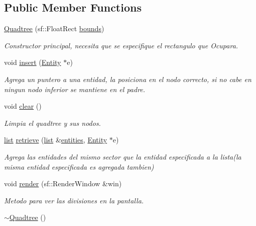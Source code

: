 \subsection*{Public Member Functions}
\begin{DoxyCompactItemize}
\item 
\hyperlink{classant_1_1_utils_1_1_quadtree_a2dc005f81ddcd318dac8d1d53460e3ff}{Quadtree} (sf\+::\+Float\+Rect \hyperlink{classant_1_1_utils_1_1_quadtree_a1b9aecf327adee874486c11a56ce5334}{bounds})
\begin{DoxyCompactList}\small\item\em Constructor principal, necesita que se especifique el rectangulo que Ocupara. \end{DoxyCompactList}\item 
void \hyperlink{classant_1_1_utils_1_1_quadtree_af1f8e490445ee493d7639dc6f621bdfc}{insert} (\hyperlink{classant_1_1_entity}{Entity} $\ast$e)
\begin{DoxyCompactList}\small\item\em Agrega un puntero a una entidad, la posiciona en el nodo correcto, si no cabe en ningun nodo inferior se mantiene en el padre. \end{DoxyCompactList}\item 
void \hyperlink{classant_1_1_utils_1_1_quadtree_aace6744ed7023825a1863f9953421a4b}{clear} ()
\begin{DoxyCompactList}\small\item\em Limpia el quadtree y sus nodos. \end{DoxyCompactList}\item 
\hyperlink{classant_1_1_utils_1_1_quadtree_a744668597e9815bc6cdeb44a48f527dd}{list} \hyperlink{classant_1_1_utils_1_1_quadtree_acef35673069f1edbafd93579e0a64df7}{retrieve} (\hyperlink{classant_1_1_utils_1_1_quadtree_a744668597e9815bc6cdeb44a48f527dd}{list} \&\hyperlink{classant_1_1_utils_1_1_quadtree_af71256d6656bfde8f416e5a34bc71607}{entities}, \hyperlink{classant_1_1_entity}{Entity} $\ast$e)
\begin{DoxyCompactList}\small\item\em Agrega las entidades del mismo sector que la entidad especificada a la lista(la misma entidad especificada es agregada tambien) \end{DoxyCompactList}\item 
void \hyperlink{classant_1_1_utils_1_1_quadtree_acb64f3de7ac64139734c78c074a5509c}{render} (sf\+::\+Render\+Window \&win)
\begin{DoxyCompactList}\small\item\em Metodo para ver las divisiones en la pantalla. \end{DoxyCompactList}\item 
\hyperlink{classant_1_1_utils_1_1_quadtree_a8d8e7d44a86d3a453684e4ead13ac8cb}{$\sim$\+Quadtree} ()
\end{DoxyCompactItemize}
